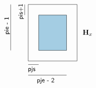 \documentclass[10pt]{article}
\begin{document}
\[\begin{tikzpicture}
%
\node[draw=black,minimum width=7em,minimum height=8em,rectangle]  at (0,0) {};
\node[draw=black,fill=nblue!40,minimum width=4em,minimum height=5em,rectangle]  at (0,0) {};
%
\node[]  at (5em,0) {${\bf H}_x$};
%
\draw[] (-4em,2.5em) -- (-4em,4em);
\node[rotate=90]  at (-4.5em,3em) {\small{\sf pis+1}};
\draw[] (-6em,-2.5em) -- (-6em,4em);
\node[rotate=90]  at (-6.5em,1em) {\small{\sf pie - 1}};
\draw[] (-3.5em,-4.5em) -- (-2em,-4.5em);
\node[]  at (-3em,-5.2em) {\small{\sf pjs}};
\draw[] (-3.5em,-6em) -- (2em,-6em);
\node[]  at (-1em,-6.8em) {\small{\sf pje - 2}};
%
\end{tikzpicture}\]
\end{document}
